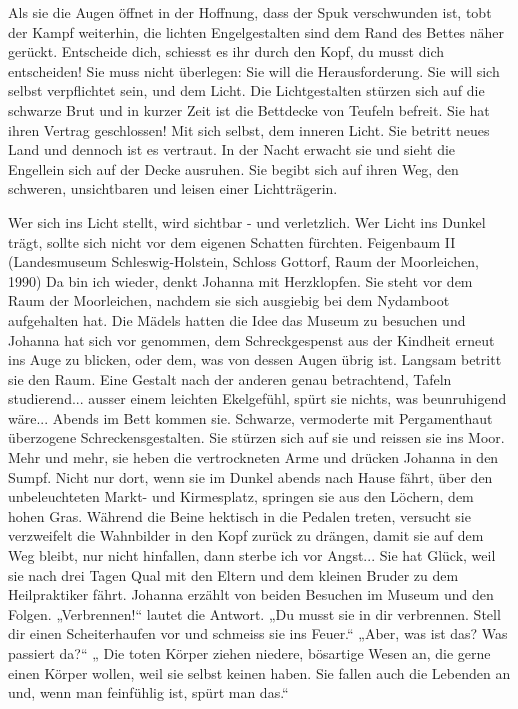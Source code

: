 Als sie die Augen öffnet in der Hoffnung, dass der Spuk verschwunden ist, tobt der Kampf weiterhin, die lichten Engelgestalten sind dem Rand des Bettes näher gerückt.
Entscheide dich, schiesst es ihr durch den Kopf, du musst dich entscheiden! Sie muss nicht überlegen: Sie will die Herausforderung. 
Sie will sich selbst verpflichtet sein, und dem Licht.
Die Lichtgestalten stürzen sich auf die schwarze Brut und in kurzer Zeit ist die Bettdecke von Teufeln befreit.
Sie hat ihren Vertrag geschlossen!
Mit sich selbst, dem inneren Licht.
Sie betritt neues  Land und dennoch ist es vertraut.
In der Nacht erwacht sie und sieht die Engellein sich auf der Decke ausruhen.
Sie begibt sich auf ihren Weg, den schweren, unsichtbaren und leisen einer Lichtträgerin.

Wer sich ins Licht stellt, wird sichtbar - und verletzlich.
Wer Licht ins Dunkel trägt, sollte sich nicht vor dem eigenen Schatten fürchten.
Feigenbaum II (Landesmuseum Schleswig-Holstein, Schloss Gottorf, Raum der Moorleichen, 1990)
Da bin ich wieder, denkt Johanna mit Herzklopfen. Sie steht vor dem Raum der Moorleichen, nachdem sie sich ausgiebig bei dem Nydamboot aufgehalten hat. Die Mädels hatten die Idee das Museum zu besuchen und Johanna hat sich vor genommen, dem Schreckgespenst aus der Kindheit erneut ins Auge zu blicken, oder dem, was von dessen Augen übrig ist.
Langsam betritt sie den Raum. Eine Gestalt nach der anderen genau betrachtend, Tafeln studierend... ausser einem leichten Ekelgefühl, spürt sie nichts, was beunruhigend wäre...
Abends im Bett kommen sie. Schwarze, vermoderte mit Pergamenthaut überzogene Schreckensgestalten. Sie stürzen sich auf sie und reissen sie ins Moor. Mehr und mehr, sie heben die vertrockneten Arme und drücken Johanna in den Sumpf. 
Nicht nur dort, wenn sie im Dunkel abends nach Hause fährt, über den unbeleuchteten Markt- und Kirmesplatz, springen sie aus den Löchern, dem hohen Gras. Während die Beine hektisch in die Pedalen treten, versucht sie verzweifelt die Wahnbilder in den Kopf zurück zu drängen, damit sie auf dem Weg bleibt, nur nicht hinfallen, dann sterbe ich vor Angst...
Sie hat Glück, weil sie nach drei Tagen Qual mit den Eltern und dem kleinen Bruder zu dem Heilpraktiker fährt. Johanna erzählt von beiden Besuchen im Museum und den Folgen. „Verbrennen!“ lautet die Antwort. „Du musst sie in dir verbrennen. Stell dir einen Scheiterhaufen vor und schmeiss sie ins Feuer.“ „Aber, was ist das? Was passiert da?“  „ Die toten Körper ziehen niedere, bösartige Wesen an, die gerne einen Körper wollen, weil sie selbst keinen haben. Sie fallen auch die Lebenden an und, wenn man feinfühlig ist, spürt man das.“
